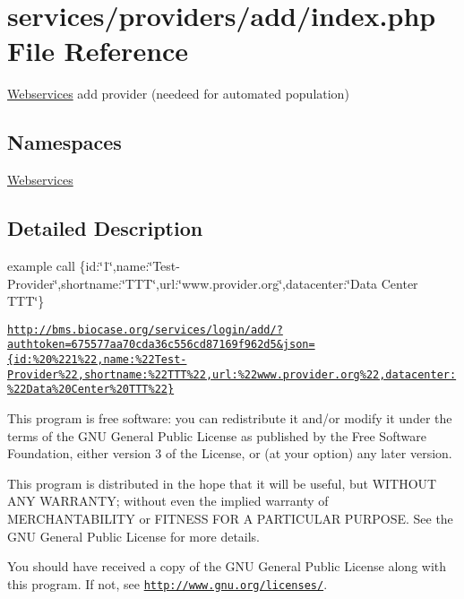 \hypertarget{services_2providers_2add_2index_8php}{}\section{services/providers/add/index.php File Reference}
\label{services_2providers_2add_2index_8php}


\hyperlink{namespace_webservices}{Webservices} add provider (needeed for automated population)  


\subsection*{Namespaces}
\begin{DoxyCompactItemize}
\item 
 \hyperlink{namespace_webservices}{Webservices}
\end{DoxyCompactItemize}


\subsection{Detailed Description}
example call \{id\+:\char`\"{}1\char`\"{},name\+:\char`\"{}\+Test-\/\+Provider\char`\"{},shortname\+:\char`\"{}\+T\+T\+T\char`\"{},url\+:\char`\"{}www.\+provider.\+org\char`\"{},datacenter\+:\char`\"{}\+Data Center T\+T\+T\char`\"{}\}

\href{http://bms.biocase.org/services/login/add/?authtoken=675577aa70cda36c556cd87169f962d5&json={id:%

This program is free software\+: you can redistribute it and/or modify it under the terms of the G\+NU General Public License as published by the Free Software Foundation, either version 3 of the License, or (at your option) any later version.

This program is distributed in the hope that it will be useful, but W\+I\+T\+H\+O\+UT A\+NY W\+A\+R\+R\+A\+N\+TY; without even the implied warranty of M\+E\+R\+C\+H\+A\+N\+T\+A\+B\+I\+L\+I\+TY or F\+I\+T\+N\+E\+SS F\+OR A P\+A\+R\+T\+I\+C\+U\+L\+AR P\+U\+R\+P\+O\+SE. See the G\+NU General Public License for more details.

You should have received a copy of the G\+NU General Public License along with this program. If not, see \href{http://www.gnu.org/licenses/}{\tt http\+://www.\+gnu.\+org/licenses/}. 